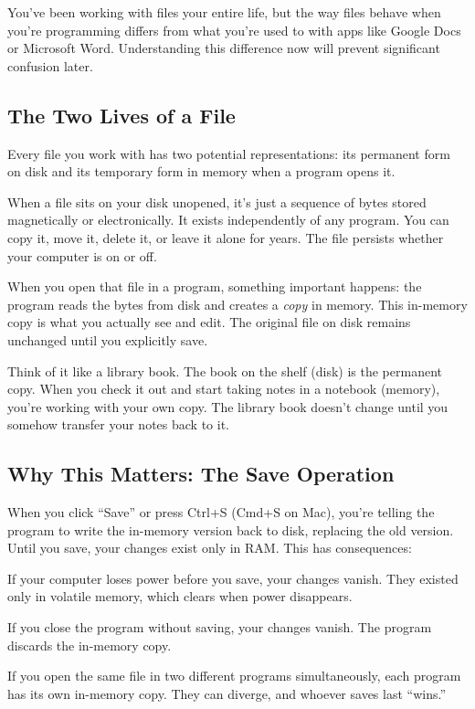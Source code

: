 \documentclass[
  letterpaper,
  DIV=11,
  numbers=noendperiod]{scrreprt}
\begin{document}
You've been working with files your entire life, but the way files
behave when you're programming differs from what you're used to with
apps like Google Docs or Microsoft Word. Understanding this difference
now will prevent significant confusion later.

\subsection{The Two Lives of a File}\label{the-two-lives-of-a-file}

Every file you work with has two potential representations: its
permanent form on disk and its temporary form in memory when a program
opens it.

When a file sits on your disk unopened, it's just a sequence of bytes
stored magnetically or electronically. It exists independently of any
program. You can copy it, move it, delete it, or leave it alone for
years. The file persists whether your computer is on or off.

When you open that file in a program, something important happens: the
program reads the bytes from disk and creates a \emph{copy} in memory.
This in-memory copy is what you actually see and edit. The original file
on disk remains unchanged until you explicitly save.

Think of it like a library book. The book on the shelf (disk) is the
permanent copy. When you check it out and start taking notes in a
notebook (memory), you're working with your own copy. The library book
doesn't change until you somehow transfer your notes back to it.

\subsection{Why This Matters: The Save
Operation}\label{why-this-matters-the-save-operation}

When you click ``Save'' or press Ctrl+S (Cmd+S on Mac), you're telling
the program to write the in-memory version back to disk, replacing the
old version. Until you save, your changes exist only in RAM. This has
consequences:

If your computer loses power before you save, your changes vanish. They
existed only in volatile memory, which clears when power disappears.

If you close the program without saving, your changes vanish. The
program discards the in-memory copy.

If you open the same file in two different programs simultaneously, each
program has its own in-memory copy. They can diverge, and whoever saves
last ``wins.''
\end{document}
